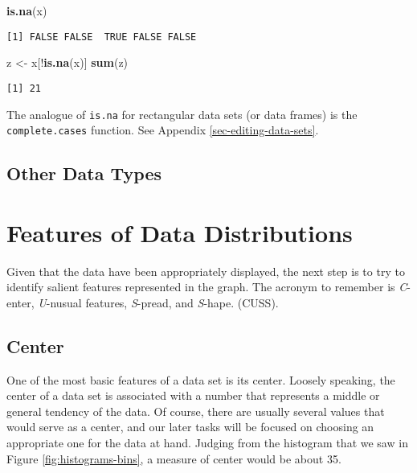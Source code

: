 \documentclass[]{book}
\newenvironment{Shaded}{\begin{snugshade}}{\end{snugshade}}
\newcommand{\KeywordTok}[1]{\textcolor[rgb]{0.13,0.29,0.53}{\textbf{{#1}}}}
\newcommand{\StringTok}[1]{\textcolor[rgb]{0.31,0.60,0.02}{{#1}}}
\newcommand{\NormalTok}[1]{{#1}}
\numberwithin{equation}{chapter}
\numberwithin{figure}{chapter}
\theoremstyle{plain}
\theoremstyle{definition}
\theoremstyle{remark}
\theoremstyle{definition}
\theoremstyle{definition}
\theoremstyle{remark}
\begin{document}
\begin{Shaded}
\begin{Highlighting}[]
\KeywordTok{is.na}\NormalTok{(x)}
\end{Highlighting}
\end{Shaded}

\begin{verbatim}
[1] FALSE FALSE  TRUE FALSE FALSE
\end{verbatim}

\begin{Shaded}
\begin{Highlighting}[]
\NormalTok{z <-}\StringTok{ }\NormalTok{x[!}\KeywordTok{is.na}\NormalTok{(x)]}
\KeywordTok{sum}\NormalTok{(z)}
\end{Highlighting}
\end{Shaded}

\begin{verbatim}
[1] 21
\end{verbatim}

The analogue of \texttt{is.na} for rectangular data sets (or data
frames) is the \texttt{complete.cases} function. See Appendix
\ref{sec-editing-data-sets}.

\subsection{Other Data Types}\label{sub-other-data-types}

\section{Features of Data Distributions}\label{sec-features-of-data}

Given that the data have been appropriately displayed, the next step is
to try to identify salient features represented in the graph. The
acronym to remember is \emph{C}-enter, \emph{U}-nusual features,
\emph{S}-pread, and \emph{S}-hape. (CUSS).

\subsection{Center}\label{sub-center}

One of the most basic features of a data set is its center. Loosely
speaking, the center of a data set is associated with a number that
represents a middle or general tendency of the data. Of course, there
are usually several values that would serve as a center, and our later
tasks will be focused on choosing an appropriate one for the data at
hand. Judging from the histogram that we saw in Figure
\ref{fig:histograms-bins}, a measure of center would be about 35.
\end{document}
